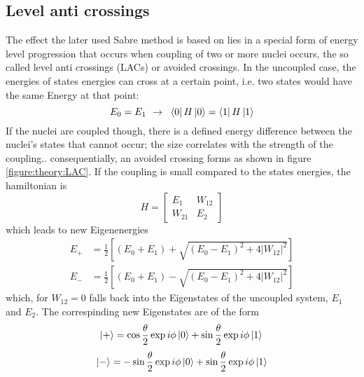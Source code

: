         \subsection{Level anti crossings}
        The effect the later used Sabre method is based on lies in a special form of energy level progression that occurs when coupling of two or more nuclei occurs, the so called level anti crossings (LACs) or avoided crossings. In the uncoupled case, the energies of states energies can cross at a certain point, i.e. two states would have the same Energy at that point:
        \begin{equation}
            E_0 = E_1 \mathrm{~~\rightarrow~~} \bra{0}H\ket{0} = \bra{1}H\ket{1}
        \end{equation}
        If the nuclei are coupled though, there is a defined energy difference between the nuclei's states that cannot occur; the size correlates with the strength of the coupling.. consequentially, an avoided crossing forms as shown in figure \ref{figure:theory:LAC}. If the coupling is small compared to the states energies, the hamiltonian is 
        \begin{equation}
            H = \left [
                \begin{array}{ll}
                    E_{1} & W_{12}\\
                    W_{21} & E_2
                \end{array}
            \right ]
        \end{equation} 
        which leads to new Eigenenergies
        \begin{align*}
            E_+ &= \frac{1}{2} \left[(E_0+ E_1) + \sqrt{(E_0-E_1)^2+4|W_{12}|^2}\right]\\
            E_- &= \frac{1}{2} \left[(E_0+ E_1) - \sqrt{(E_0-E_1)^2+4|W_{12}|^2}\right]
        \end{align*}
        which, for $W_{12}=0$ falls back into the Eigenstates of the uncoupled system, $E_1$ and $E_2$. The correspinding new Eigenstates are of the form
        \begin{equation*}
            \ket{+} = \cos\frac{{\theta}}{2}\exp{i\phi}\ket{0} + \sin{\frac{\theta}{2}}\exp{i\phi}\ket{1}\\
        \end{equation*}
        \begin{equation*}
            \ket{-} = -\sin{\frac{\theta}{2}}\exp{i\phi}\ket{0} + \sin{\frac{\theta}{2}}\exp{i\phi}\ket{1}
        \end{equation*}
